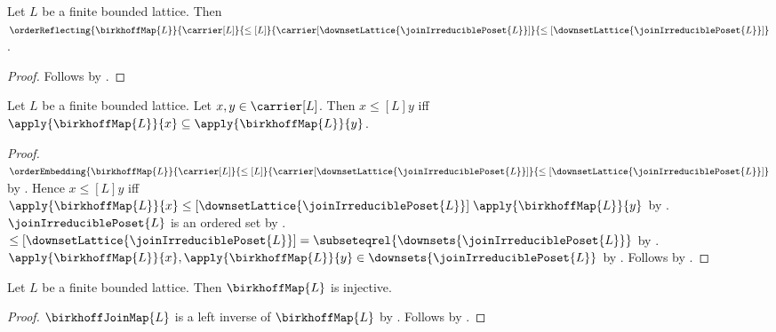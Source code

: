 \begin{proposition}\label{birkhoff_map_order_reflecting}
    Let $L$ be a finite bounded lattice.
    Then
        $\orderReflecting
            {\birkhoffMap{L}}
            {\carrier[L]}{\leq[L]}
            {\carrier[\downsetLattice{\joinIrreduciblePoset{L}}]}
            {\leq[\downsetLattice{\joinIrreduciblePoset{L}}]}$.
\end{proposition}
\begin{proof}
    Follows by
        .
\end{proof}

\begin{proposition}\label{birkhoff_map_order_iff}
    Let $L$ be a finite bounded lattice.
    Let $x,y\in\carrier[L]$.
    Then $x\mathrel{\leq[L]}y$ iff
        $\apply{\birkhoffMap{L}}{x}
            \subseteq\apply{\birkhoffMap{L}}{y}$.
\end{proposition}
\begin{proof}
    $\orderEmbedding
        {\birkhoffMap{L}}
        {\carrier[L]}{\leq[L]}
        {\carrier[\downsetLattice{\joinIrreduciblePoset{L}}]}
        {\leq[\downsetLattice{\joinIrreduciblePoset{L}}]}$ by
        .
    Hence $x\mathrel{\leq[L]}y$ iff
        $\apply{\birkhoffMap{L}}{x}
            \mathrel{\leq[\downsetLattice{\joinIrreduciblePoset{L}}]}
                \apply{\birkhoffMap{L}}{y}$ by
        .
    $\joinIrreduciblePoset{L}$ is an ordered set by
        .
    $\leq[\downsetLattice{\joinIrreduciblePoset{L}}]
        =\subseteqrel{\downsets{\joinIrreduciblePoset{L}}}$ by
        .
    $\apply{\birkhoffMap{L}}{x},\apply{\birkhoffMap{L}}{y}
        \in\downsets{\joinIrreduciblePoset{L}}$ by
        .
    Follows by .
\end{proof}

\begin{proposition}\label{birkhoff_map_injective}
    Let $L$ be a finite bounded lattice.
    Then $\birkhoffMap{L}$ is injective.
\end{proposition}
\begin{proof}
    $\birkhoffJoinMap{L}$ is a left inverse of $\birkhoffMap{L}$ by
        .
    Follows by .
\end{proof}

